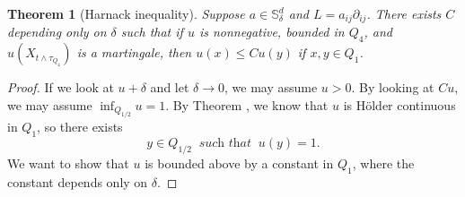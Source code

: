 \documentclass[twoside, 12pt]{book}
\numberwithin{equation}{chapter}
\newtheorem{theorem}{Theorem}[section]
\def\mS{{\mathbb S}}
\def\leq{\leqslant}
\def\p{\partial}
\begin{document}
	
	
	\begin{theorem}[Harnack inequality]\label{thm:harnack}
 Suppose $a\in \mS^d_\delta$ and $L=a_{ij}\p_{ij}$. There exists $C$ depending only on $\delta$ such that if $u$ is nonnegative, bounded in $Q_4$, and $u(X_{t \wedge \tau_{Q_4}})$ is a martingale, then $u(x) \leq C u(y)$ if $x, y \in Q_1$.
    \end{theorem}
    \begin{proof}
        If we look at $u+\delta$ and let $\delta \rightarrow 0$, we may assume $u>0$. By looking at $C u$, we may assume $\inf _{Q_{1/2}} u=1$. By Theorem , we know that $u$ is Hölder continuous in $Q_1$, so there exists
        \[
            y \in Q_{1 / 2} ~\textit{ such that }~ u(y)=1. 
        \]
        We want to show that $u$ is bounded above by a constant in $Q_1$, where the constant depends only on $\delta$.
        

\end{proof}
\end{document}
